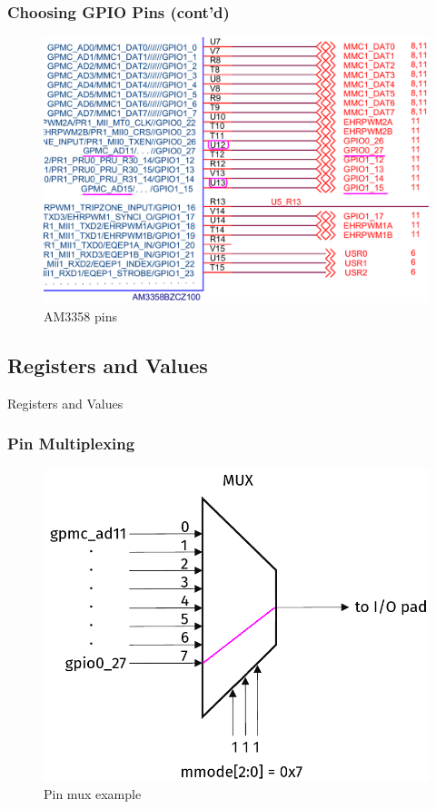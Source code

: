 \begin{frame}
  \frametitle{Choosing GPIO Pins (cont'd)}
  \begin{figure}
    \centering
    \includegraphics[scale=0.2]{images/soc-pins.png}
    \caption{AM3358 pins}
  \end{figure}
  \vspace*{-10mm}
\end{frame}

\subsection{Registers and Values}

\begin{frame}[standout]
  Registers and Values
\end{frame}

\begin{frame}
  \frametitle{Pin Multiplexing}
  \begin{figure}
    \centering
    \includegraphics[scale=0.3]{images/mux.png}
    \caption{Pin mux example}
  \end{figure}
\end{frame}

